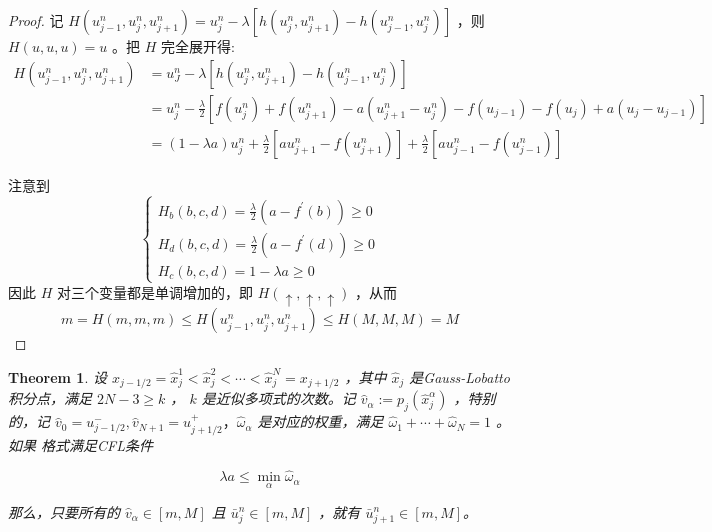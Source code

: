 \documentclass{article}
\newtheorem{theorem}{Theorem}
\numberwithin{equation}{subsection}    %
\begin{document}
\begin{proof}
    记  $H\left(u_{j-1}^{n}, u_{j}^{n}, u_{j+1}^{n}\right)=u_{j}^{n}-\lambda\left[h\left(u_{j}^{n}, u_{j+1}^{n}\right)-h\left(u_{j-1}^{n}, u_{j}^{n}\right)\right]$ ，则  $H(u, u, u)=u$  。把  $H$  完全展开得:
    \begin{equation}
        \begin{aligned}
            H\left(u_{j-1}^{n}, u_{j}^{n}, u_{j+1}^{n}\right) & =u_{J}^{n}-\lambda\left[h\left(u_{j}^{n}, u_{j+1}^{n}\right)-h\left(u_{j-1}^{n}, u_{j}^{n}\right)\right]                                                                                             \\
                                                              & =u_{j}^{n}-\frac{\lambda}{2}\left[f\left(u_{j}^{n}\right)+f\left(u_{j+1}^{n}\right)-a\left(u_{j+1}^{n}-u_{j}^{n}\right)-f\left(u_{j-1}\right)-f\left(u_{j}\right)+a\left(u_{j}-u_{j-1}\right)\right] \\
                                                              & =(1-\lambda a) u_{j}^{n}+\frac{\lambda}{2}\left[a u_{j+1}^{n}-f\left(u_{j+1}^{n}\right)\right]+\frac{\lambda}{2}\left[a u_{j-1}^{n}-f\left(u_{j-1}^{n}\right)\right]
        \end{aligned}
    \end{equation}

    注意到
    \begin{equation}
        \begin{cases}
            H_{b}(b, c, d)=\frac{\lambda}{2}\left(a-f^{\prime}(b)\right) \geqslant 0 \\
            H_{d}(b, c, d)=\frac{\lambda}{2}\left(a-f^{\prime}(d)\right) \geqslant 0 \\
            H_{c}(b, c, d)=1 -\lambda a \geqslant 0
        \end{cases}
    \end{equation}
    因此  $H$ 对三个变量都是单调增加的，即  $H(\uparrow, \uparrow, \uparrow)$  ，从而
    \begin{equation}
        m=H(m, m, m) \leq H\left(u_{j-1}^{n}, u_{j}^{n}, u_{j+1}^{n}\right) \leq H(M, M, M)=M
    \end{equation}

\end{proof}
\begin{theorem}
    设  $x_{j-1 / 2}=\hat{x}_{j}^{1}<\hat{x}_{j}^{2}<\cdots<\hat{x}_{j}^{N}=x_{j+1 / 2}$  ，其中  $\hat{x}_{j}$  是Gauss-Lobatto积分点，满足  $2 N-3 \geq k$ ， $k$  是近似多项式的次数。记  $\hat{v}_{\alpha}:=p_{j}\left(\hat{x}_{j}^{\alpha}\right)$ ，特别的，记  $\hat{v}_{0}=u_{j-1 / 2}^{-}, \hat{v}_{N+1}=u_{j+1 / 2}^{+} ， \hat{\omega}_{\alpha}$  是对应的权重，满足  $\hat{\omega}_{1}+\cdots+\hat{\omega}_{N}=1$  。如果 格式满足CFL条件

    \begin{equation}
        \lambda a \leq \min _{\alpha} \hat{\omega}_{\alpha}
    \end{equation}

    那么，只要所有的  $\hat{v}_{\alpha} \in[m, M]$  且  $\bar{u}_{j}^{n} \in[m, M]$  ，就有 $ \bar{u}_{j+1}^{n} \in[m, M]$。
\end{theorem}
\end{document}
